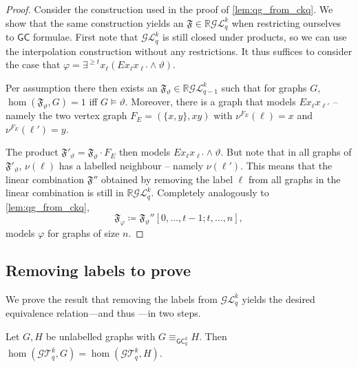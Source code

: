 \documentclass[a4paper,UKenglish,cleveref, autoref, thm-restate]{lipics-v2021}
\renewcommand{\theta}{\vartheta}
\newcommand{\R}{\ensuremath{\mathbb{R}}}
\newcommand{\Ekq}{\ensuremath{\mathcal{T}_{q}^{k}}}
\newcommand{\Lkq}{\ensuremath{\mathcal{L}_{q}^{k}}}
\newcommand{\LParam}[2]{\ensuremath{\mathcal{L}_{#2}^{#1}}}
\newcommand{\GEkq}{\ensuremath{\mathcal{G}\Lkq}}
\newcommand{\GEParam}[2]{\ensuremath{\mathcal{G}\LParam{#1}{#2}}}
\newcommand{\GEkqLL}{\ensuremath{\mathcal{G}\Ekq}}
\newcommand{\lGC}{\ensuremath{\mathsf{GC}}}
\newcommand{\qg}[1]{\ensuremath{\mathfrak{#1}}} \newcommand{\qgp}[3]{\ensuremath{\mathfrak{#1}[#3; #2]}}
\begin{document}
  \begin{proof}
    Consider the construction used in the proof of \cref{lem:qg_from_ckq}. We show that the same construction yields an $\qg{F} \in \R\GEkq$ when restricting ourselves to $\lGC$ formulae. First note that $\GEkq$ is still closed under products, so we can use the interpolation construction without any restrictions. It thus suffices to consider the case that $\varphi = \exists^{\geq t} x_\ell (Ex_{\ell}x_{\ell'} \land \theta)$.

    Per assumption there then exists an $\qg{F_\theta} \in \R\GEParam{k}{q-1}$ such that for graphs $G$, $\hom(\qg{F_\theta}, G) = 1$ iff $G \models \theta$. Moreover, there is a graph that models $Ex_{\ell}x_{\ell'}$ -- namely the two vertex graph $F_E = (\{x, y\}, {xy})$ with $\nu^{F_E}(\ell) = x$ and $\nu^{F_E}(\ell') = y$.

    The product $\qg{F'_\theta} = \qg{F}_\theta \cdot F_E$ then models $Ex_{\ell}x_{\ell'} \land \theta$. But note that in all graphs of $\qg{F'_\theta}$, $\nu(\ell)$ has a labelled neighbour -- namely $\nu(\ell')$. This means that the linear combination $\qg{F''}$ obtained by removing the label $\ell$ from all graphs in the linear combination is still in $\R\GEkq$. Completely analogously to \cref{lem:qg_from_ckq},
    \begin{equation*}
      \qg{F_\varphi} \coloneqq \qgp{F_\theta''}{t, \dots, n}{0, \dots, t-1},
    \end{equation*}
    models $\varphi$ for graphs of size $n$.
  \end{proof}

  \subsection{Removing labels to prove }

  We prove the result that removing the labels from $\GEkq$ yields the desired equivalence relation---and thus ---in two steps.


  \begin{lemma}\label{lem:labelsFw}
  Let $G, H$ be unlabelled graphs with $G \equiv_{\lGC^k_q} H$. Then $\hom(\GEkqLL, G) = \hom(\GEkqLL, H)$.
\end{lemma}
\end{document}
